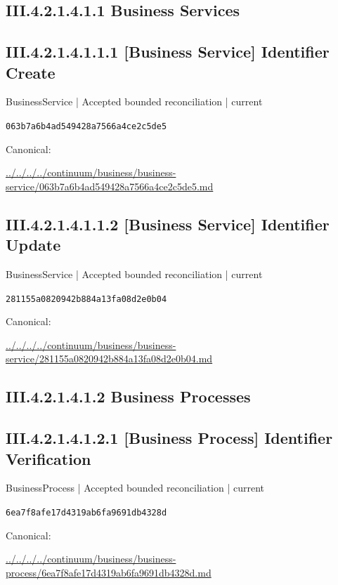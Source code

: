 \documentclass[10pt,a4paper]{article}
\begin{document}
\subsection*{III.4.2.1.4.1.1 Business Services}
\subsection*{III.4.2.1.4.1.1.1 [Business Service] Identifier Create}
\label{element-063b7a6b4ad549428a7566a4ce2c5de5}
{\small BusinessService | Accepted bounded reconciliation | current}\par
\texttt{063b7a6b4ad549428a7566a4ce2c5de5}\par
Canonical: \par
{\footnotesize\url{../../../../continuum/business/business-service/063b7a6b4ad549428a7566a4ce2c5de5.md}}\par
\subsection*{III.4.2.1.4.1.1.2 [Business Service] Identifier Update}
\label{element-281155a0820942b884a13fa08d2e0b04}
{\small BusinessService | Accepted bounded reconciliation | current}\par
\texttt{281155a0820942b884a13fa08d2e0b04}\par
Canonical: \par
{\footnotesize\url{../../../../continuum/business/business-service/281155a0820942b884a13fa08d2e0b04.md}}\par
\subsection*{III.4.2.1.4.1.2 Business Processes}
\subsection*{III.4.2.1.4.1.2.1 [Business Process] Identifier Verification}
\label{element-6ea7f8afe17d4319ab6fa9691db4328d}
{\small BusinessProcess | Accepted bounded reconciliation | current}\par
\texttt{6ea7f8afe17d4319ab6fa9691db4328d}\par
Canonical: \par
{\footnotesize\url{../../../../continuum/business/business-process/6ea7f8afe17d4319ab6fa9691db4328d.md}}\par
\end{document}
